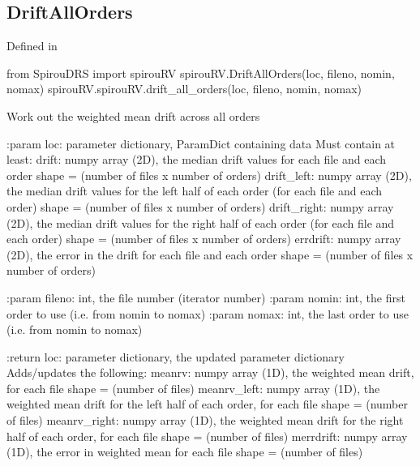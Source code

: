 \begin{minipage}{\textwidth}
\subsection{DriftAllOrders}

Defined in \spirouRV{}

\begin{pythonbox}
from SpirouDRS import spirouRV
spirouRV.DriftAllOrders(loc, fileno, nomin, nomax)
spirouRV.spirouRV.drift_all_orders(loc, fileno, nomin, nomax)
\end{pythonbox}

\begin{pythondocstring}
Work out the weighted mean drift across all orders

:param loc: parameter dictionary, ParamDict containing data
        Must contain at least:
            drift: numpy array (2D), the median drift values for each
                   file and each order
                   shape = (number of files x number of orders)
            drift_left: numpy array (2D), the median drift values for the
                        left half of each order (for each file and each
                        order)
                        shape = (number of files x number of orders)
            drift_right: numpy array (2D), the median drift values for the
                         right half of each order (for each file and each
                         order)
                         shape = (number of files x number of orders)
            errdrift: numpy array (2D), the error in the drift for each
                      file and each order
                      shape = (number of files x number of orders)

:param fileno: int, the file number (iterator number)
:param nomin: int, the first order to use (i.e. from nomin to nomax)
:param nomax: int, the last order to use (i.e. from nomin to nomax)

:return loc: parameter dictionary, the updated parameter dictionary
        Adds/updates the following:
            meanrv: numpy array (1D), the weighted mean drift, for each file
                    shape = (number of files)
            meanrv_left: numpy array (1D), the weighted mean drift for the
                         left half of each order, for each file
                         shape = (number of files)
            meanrv_right: numpy array (1D), the weighted mean drift for the
                          right half of each order, for each file
                          shape = (number of files)
            merrdrift: numpy array (1D), the error in weighted mean for
                       each file
                       shape = (number of files)
\end{pythondocstring}
\end{minipage}

